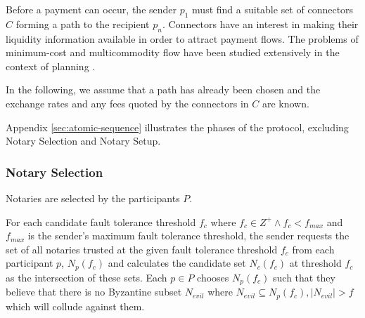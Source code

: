 \documentclass[letterpaper,twocolumn,10pt]{article}
\begin{document}
Before a payment can occur, the sender $p_1$ must find a suitable set of connectors $C$ forming a path to the recipient $p_n$. Connectors have an interest in making their liquidity information available in order to attract payment flows. The problems of minimum-cost and multicommodity flow have been studied extensively in the context of planning \cite{ahuja1988network,cai2001time,wagner1959class}.

In the following, we assume that a path has already been chosen and the exchange rates and any fees quoted by the connectors in $C$ are known.

Appendix \ref{sec:atomic-sequence} illustrates the phases of the protocol, excluding Notary Selection and Notary Setup.

\subsubsection{Notary Selection}
\label{subsec:notary-selection}






Notaries are selected by the participants $P$.

For each candidate fault tolerance threshold $f_c$ where $f_c \in Z^+ \land f_c < f_{max}$ and $f_{max}$ is the sender's maximum fault tolerance threshold, the sender requests the set of all notaries trusted at the given fault tolerance threshold $f_c$ from each participant $p$, $N_p(f_c)$ and calculates the candidate set $N_c(f_c)$ at threshold $f_c$ as the intersection of these sets. Each $p \in P$ chooses $N_p(f_c)$ such that they believe that there is no Byzantine subset $N_{evil}$ where $N_{evil} \subseteq N_p(f_c), |N_{evil}| > f$ which will collude against them.
\end{document}
